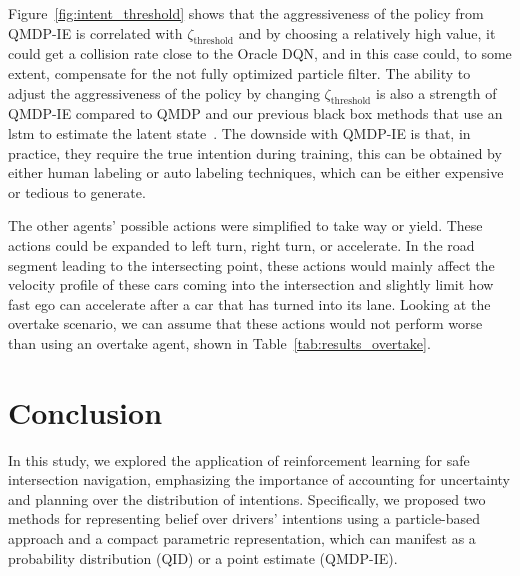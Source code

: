 Figure~\ref{fig:intent_threshold} shows that the aggressiveness of the policy from QMDP-IE is correlated with $\zeta_\text{threshold}$ and by choosing a relatively high value, it could get a collision rate close to the Oracle DQN, and in this case could, to some extent, compensate for the not fully optimized particle filter. The ability to adjust the aggressiveness of the policy by changing $\zeta_\text{threshold}$ is also a strength of QMDP-IE compared to QMDP and our previous black box methods that use an \gls{lstm} to estimate the latent state~\cite{Tram2018}. %
The downside with QMDP-IE is that, in practice, they require the true intention during training, this can be obtained by either human labeling or auto labeling techniques, which can be either expensive or tedious to generate. 

The other agents' possible actions were simplified to take way or yield. These actions could be expanded to left turn, right turn, or accelerate. In the road segment leading to the intersecting point, these actions would mainly affect the velocity profile of these cars coming into the intersection and slightly limit how fast ego can accelerate after a car that has turned into its lane. Looking at the overtake scenario, we can assume that these actions would not perform worse than using an overtake agent, shown in Table~\ref{tab:results_overtake}.

\section{Conclusion}
\label{sec:conclusion}
In this study, we explored the application of reinforcement learning for safe intersection navigation, emphasizing the importance of accounting for uncertainty and planning over the distribution of intentions. Specifically, we proposed two methods for representing belief over drivers' intentions using a particle-based approach and a compact parametric representation, which can manifest as a probability distribution (QID) or a point estimate (QMDP-IE).

